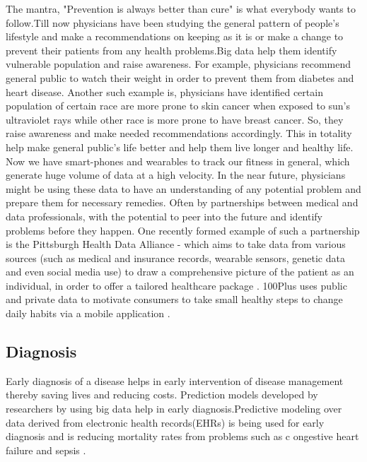\documentclass[sigconf]{acmart}
\begin{document}
The mantra, "Prevention is always better than cure" is what everybody
wants to follow.Till now physicians have been studying the general pattern of people's lifestyle and make a recommendations on 
keeping as it is or make a change to prevent their patients from any health problems.Big data help them identify vulnerable 
population and raise awareness. For example, physicians recommend general public to watch their weight in order to prevent them 
from diabetes and heart disease. Another such example is, physicians have identified certain population of certain race are more
prone to skin cancer when exposed to sun's ultraviolet rays while other race is more prone to have breast cancer. So, they 
raise awareness and make needed recommendations accordingly. This in totality help make general public's life better and help them live
longer and healthy life. Now we have smart-phones and wearables to track our fitness in general, which generate huge volume of data 
at a high velocity. In the near future, physicians might be using these data to have an understanding of any potential problem 
and prepare them for necessary remedies. Often by partnerships between medical and data professionals, with the potential to peer 
into the future and identify problems before they happen\cite{www-forbes-com}. One recently formed example of such a partnership is 
the Pittsburgh Health Data Alliance - which aims to take data from various sources (such as medical and insurance records, 
wearable sensors, genetic data and even social media use) to draw a comprehensive picture of the patient as an individual, in order 
to offer a tailored healthcare package \cite{www-forbes-com}. 100Plus uses public and private data to motivate consumers to take 
small healthy steps to change daily habits via a mobile application \cite{www-ghdonline-org}.  

 

\subsection{Diagnosis}
Early diagnosis of a disease helps in early intervention of disease management thereby saving lives and reducing costs. 
Prediction models developed by researchers by using big data help in early diagnosis.Predictive modeling over data derived 
from electronic health records(EHRs) is being used for early diagnosis and is reducing mortality rates from problems such as c
ongestive heart failure and sepsis \cite{www-mapr-com}.
\end{document}
